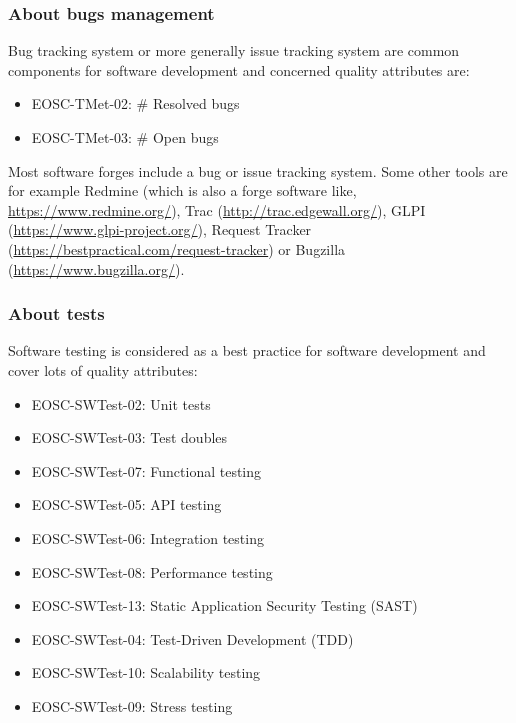 \subsubsection{About bugs management}

Bug tracking system or more generally issue tracking system are
common components for software development and concerned quality
attributes are:

\begin{itemize}
  \item EOSC-TMet-02: \# Resolved bugs
  \item EOSC-TMet-03: \# Open bugs
\end{itemize}

Most software forges include a bug or issue tracking system. Some
other tools are for example Redmine (which is also a forge software
like, \url{https://www.redmine.org/}), Trac
(\url{http://trac.edgewall.org/}), GLPI
(\url{https://www.glpi-project.org/}), Request Tracker
(\url{https://bestpractical.com/request-tracker}) or Bugzilla
(\url{https://www.bugzilla.org/}).


\subsubsection{About tests}

Software testing is considered as a best practice for software
development and cover lots of quality attributes:

\begin{itemize}
  \item EOSC-SWTest-02: Unit tests
  \item EOSC-SWTest-03: Test doubles
  \item EOSC-SWTest-07: Functional testing
  \item EOSC-SWTest-05: API testing
  \item EOSC-SWTest-06: Integration testing
  \item EOSC-SWTest-08: Performance testing
  \item EOSC-SWTest-13: Static Application Security Testing (SAST)
  \item EOSC-SWTest-04: Test-Driven Development (TDD)
  \item EOSC-SWTest-10: Scalability testing
  \item EOSC-SWTest-09: Stress testing
\end{itemize}

